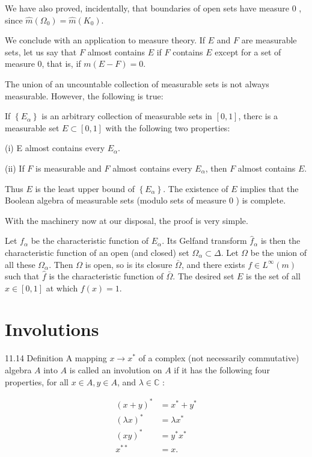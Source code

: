 \documentclass[10pt]{article}
\begin{document}
We have also proved, incidentally, that boundaries of open sets have measure 0 , since $\hat{m}\left(\Omega_{0}\right)=\hat{m}\left(K_{0}\right)$.

We conclude with an application to measure theory. If $E$ and $F$ are measurable sets, let us say that $F$ almost contains $E$ if $F$ contains $E$ except for a set of measure 0, that is, if $m(E-F)=0$.

The union of an uncountable collection of measurable sets is not always measurable. However, the following is true:

If $\left\{E_{\alpha}\right\}$ is an arbitrary collection of measurable sets in $[0,1]$, therc is a measurable set $E \subset[0,1]$ with the following two properties:

(i) E almost contains every $E_{\alpha}$.

(ii) If $F$ is measurable and $F$ almost contains every $E_{\alpha}$, then $F$ almost contains $E$.

Thus $E$ is the least upper bound of $\left\{E_{\alpha}\right\}$. The existence of $E$ implies that the Boolean algebra of measurable sets (modulo sets of measure 0 ) is complete.

With the machinery now at our disposal, the proof is very simple.

Let $f_{\alpha}$ be the characteristic function of $E_{\alpha}$. Its Gelfand transform $\hat{f}_{\alpha}$ is then the characteristic function of an open (and closed) set $\Omega_{\alpha} \subset \Delta$. Let $\Omega$ be the union of all these $\Omega_{\alpha}$. Then $\Omega$ is open, so is its closure $\bar{\Omega}$, and there exists $f \in L^{\infty}(m)$ such that $\hat{f}$ is the characteristic function of $\bar{\Omega}$. The desired set $E$ is the set of all $x \in[0,1]$ at which $f(x)=1$.

\section{Involutions}
11.14 Definition A mapping $x \rightarrow x^{*}$ of a complex (not necessarily commutative) algebra $A$ into $A$ is called an involution on $A$ if it has the following four properties, for all $x \in A, y \in A$, and $\lambda \in \mathbb{C}$ :

$$
\begin{aligned}
(x+y)^{*} & =x^{*}+y^{*} \\
(\lambda x)^{*} & =\lambda x^{*} \\
(x y)^{*} & =y^{*} x^{*} \\
x^{* *} & =x .
\end{aligned}
$$
\end{document}
